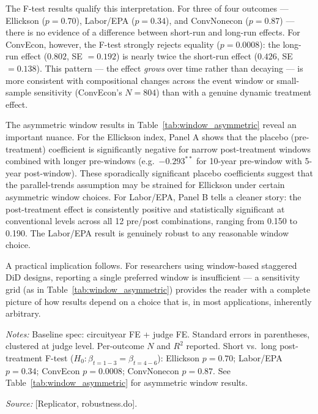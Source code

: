 \documentclass[12pt,a4paper]{article}
\begin{document}
The F-test results qualify this interpretation. For three of four outcomes --- Ellickson ($p=0.70$), Labor/EPA ($p=0.34$), and ConvNonecon ($p=0.87$) --- there is no evidence of a difference between short-run and long-run effects. For ConvEcon, however, the F-test strongly rejects equality ($p=0.0008$): the long-run effect ($0.802$, SE $=0.192$) is nearly twice the short-run effect ($0.426$, SE $=0.138$). This pattern --- the effect \emph{grows} over time rather than decaying --- is more consistent with compositional changes across the event window or small-sample sensitivity (ConvEcon's $N=804$) than with a genuine dynamic treatment effect.

The asymmetric window results in Table~\ref{tab:window_asymmetric} reveal an important nuance. For the Ellickson index, Panel A shows that the placebo (pre-treatment) coefficient is significantly negative for narrow post-treatment windows combined with longer pre-windows (e.g.\ $-0.293^{**}$ for 10-year pre-window with 5-year post-window). These sporadically significant placebo coefficients suggest that the parallel-trends assumption may be strained for Ellickson under certain asymmetric window choices. For Labor/EPA, Panel B tells a cleaner story: the post-treatment effect is consistently positive and statistically significant at conventional levels across all 12 pre/post combinations, ranging from 0.150 to 0.190. The Labor/EPA result is genuinely robust to any reasonable window choice.

A practical implication follows. For researchers using window-based staggered DiD designs, reporting a single preferred window is insufficient --- a sensitivity grid (as in Table~\ref{tab:window_asymmetric}) provides the reader with a complete picture of how results depend on a choice that is, in most applications, inherently arbitrary.

\begin{table}[H]
\centering
\small
\caption{TWFE Coefficient by Event Window Width}
\label{tab:window}
\begin{threeparttable}

\begin{tablenotes}
\item {\small \textit{Notes:} Baseline spec: circuityear FE + judge FE. Standard errors in parentheses, clustered at judge level. Per-outcome \(N\) and \(R^{2}\) reported. Short vs.\ long post-treatment F-test (\(H_0: \beta_{t=1-3} = \beta_{t=4-6}\)): Ellickson \(p=0.70\); Labor/EPA \(p=0.34\); ConvEcon \(p=0.0008\); ConvNonecon \(p=0.87\). See Table~\ref{tab:window_asymmetric} for asymmetric window results.}
\item {\small \textit{Source:} [Replicator, robustness.do].}
\end{tablenotes}
\end{threeparttable}
\end{table}
\end{document}
